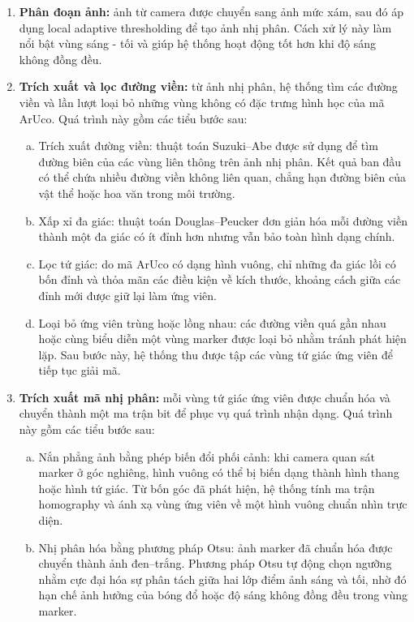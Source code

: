 \begin{enumerate}
  \item \textbf{Phân đoạn ảnh:} ảnh từ camera được chuyển sang ảnh mức xám, sau đó áp dụng local adaptive
thresholding để tạo ảnh nhị phân. 
Cách xử lý này làm nổi bật vùng sáng - tối và giúp hệ thống hoạt động tốt hơn khi độ sáng không đồng đều.
  \item \textbf{Trích xuất và lọc đường viền:} từ ảnh nhị phân, hệ thống tìm các đường viền và lần lượt loại bỏ những vùng không có đặc trưng hình học của mã ArUco. Quá trình này gồm các tiểu bước sau:
  \begin{enumerate}[a)]
    \item Trích xuất đường viền: thuật toán Suzuki--Abe được sử dụng để tìm đường biên của các vùng liên thông trên ảnh nhị phân. Kết quả ban đầu có thể chứa nhiều đường viền không liên quan, chẳng hạn đường biên của vật thể hoặc hoa văn trong môi trường.
    \item Xấp xỉ đa giác: thuật toán Douglas--Peucker đơn giản hóa mỗi đường viền thành một đa giác có ít đỉnh hơn nhưng vẫn bảo toàn hình dạng chính.
    \item Lọc tứ giác: do mã ArUco có dạng hình vuông, chỉ những đa giác lồi có bốn đỉnh và thỏa mãn các điều kiện về kích thước, khoảng cách giữa các đỉnh mới được giữ lại làm ứng viên.
    \item Loại bỏ ứng viên trùng hoặc lồng nhau:
     các đường viền quá gần nhau hoặc cùng biểu 
     diễn một vùng marker được loại bỏ nhằm 
     tránh phát hiện lặp. Sau bước này, hệ 
     thống thu được tập các vùng tứ giác ứng viên để tiếp tục giải mã.
  \end{enumerate}
  \item \textbf{Trích xuất mã nhị phân:} mỗi vùng tứ giác ứng viên được chuẩn hóa và chuyển thành một ma trận bit để phục vụ quá trình nhận dạng. Quá trình này gồm các tiểu bước sau:
  \begin{enumerate}[a)]
    \item Nắn phẳng ảnh bằng phép biến đổi phối cảnh: khi camera quan sát marker ở góc nghiêng, hình vuông có thể bị biến dạng thành hình thang hoặc hình tứ giác. Từ bốn góc đã phát hiện, hệ thống tính ma trận homography và ánh xạ vùng ứng viên về một hình vuông chuẩn nhìn trực diện.
    \item Nhị phân hóa bằng phương pháp Otsu: ảnh marker đã chuẩn hóa được chuyển thành ảnh đen--trắng. Phương pháp Otsu tự động chọn ngưỡng nhằm cực đại hóa sự phân tách giữa hai lớp điểm ảnh sáng và tối, nhờ đó hạn chế ảnh hưởng của bóng đổ hoặc độ sáng không đồng đều trong vùng marker.

\end{enumerate}
\end{enumerate}
